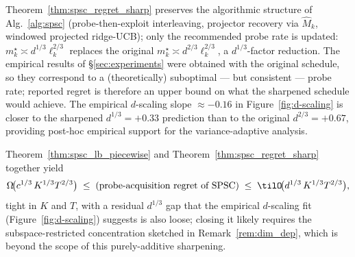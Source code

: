 \begin{remark}
\label{rem:no_algo_change}
Theorem~\ref{thm:spsc_regret_sharp} preserves the algorithmic
structure of Alg.~\ref{alg:spsc} (probe-then-exploit interleaving,
projector recovery via $\widehat M_k$, windowed projected ridge-UCB);
only the recommended probe rate is updated:
$m_k^\star\asymp d^{1/3}\ell_k^{2/3}$ replaces the original
$m_k^\star\asymp d^{2/3}\ell_k^{2/3}$, a $d^{1/3}$-factor reduction.
The empirical results of \S\ref{sec:experiments} were obtained with
the original schedule, so they correspond to a (theoretically)
suboptimal — but consistent — probe rate; reported regret is therefore
an upper bound on what the sharpened schedule would achieve.
The empirical $d$-scaling slope $\approx-0.16$ in Figure~\ref{fig:d-scaling}
is closer to the sharpened $d^{1/3}=+0.33$ prediction than to the
original $d^{2/3}=+0.67$, providing post-hoc empirical support for
the variance-adaptive analysis.
\end{remark}

\begin{remark}
\label{rem:combined_after_ext}
Theorem~\ref{thm:spsc_lb_piecewise} and
Theorem~\ref{thm:spsc_regret_sharp} together yield
\[
\Omega\!\bigl(c^{1/3}\,K^{1/3}T^{2/3}\bigr)
\;\le\;\text{(probe-acquisition regret of SPSC)}\;\le\;
\tilO\!\bigl(d^{1/3}\,K^{1/3}T^{2/3}\bigr),
\]
tight in $K$ and $T$, with a residual $d^{1/3}$ gap that the
empirical $d$-scaling fit (Figure~\ref{fig:d-scaling}) suggests is
also loose; closing it likely requires the subspace-restricted
concentration sketched in Remark~\ref{rem:dim_dep}, which is beyond
the scope of this purely-additive sharpening.
\end{remark}

